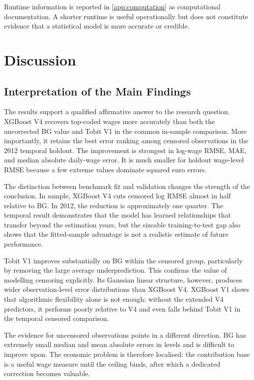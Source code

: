 \documentclass[12pt,a4paper,oneside,titlepage]{book}
\begin{document}
Runtime information is reported in \cref{app:computation} as computational documentation. A shorter runtime is useful operationally but does not constitute evidence that a statistical model is more accurate or credible.

\chapter{Discussion}
\label{ch:discussion}

\section{Interpretation of the Main Findings}
The results support a qualified affirmative answer to the research question. XGBoost V4 recovers top-coded wages more accurately than both the uncorrected BG value and Tobit V1 in the common in-sample comparison. More importantly, it retains the best error ranking among censored observations in the 2012 temporal holdout. The improvement is strongest in log-wage RMSE, MAE, and median absolute daily-wage error. It is much smaller for holdout wage-level RMSE because a few extreme values dominate squared euro errors.

The distinction between benchmark fit and validation changes the strength of the conclusion. In sample, XGBoost V4 cuts censored log RMSE almost in half relative to BG. In 2012, the reduction is approximately one quarter. The temporal result demonstrates that the model has learned relationships that transfer beyond the estimation years, but the sizeable training-to-test gap also shows that the fitted-sample advantage is not a realistic estimate of future performance.

Tobit V1 improves substantially on BG within the censored group, particularly by removing the large average underprediction. This confirms the value of modelling censoring explicitly. Its Gaussian linear structure, however, produces wider observation-level error distributions than XGBoost V4. XGBoost V1 shows that algorithmic flexibility alone is not enough: without the extended V4 predictors, it performs poorly relative to V4 and even falls behind Tobit V1 in the temporal censored comparison.

The evidence for uncensored observations points in a different direction. BG has extremely small median and mean absolute errors in levels and is difficult to improve upon. The economic problem is therefore localised: the contribution base is a useful wage measure until the ceiling binds, after which a dedicated correction becomes valuable.
\end{document}
